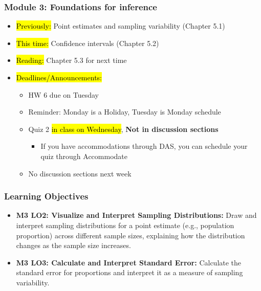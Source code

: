 \begin{frame}
    \frametitle{Module 3: Foundations for inference}
    \begin{itemize}
        \item \hl{Previously: }Point estimates and sampling variability (Chapter 5.1)
        \item \hl{This time: }Confidence intervals (Chapter 5.2)
        \item \hl{Reading: }Chapter 5.3 for next time
        \item \hl{Deadlines/Announcements: }
        \begin{itemize}
            \item HW 6 due on Tuesday
            \item Reminder: Monday is a Holiday, Tuesday is Monday schedule
            \item Quiz 2 \hl{in class on Wednesday}, \textbf{Not in discussion sections}
            \begin{itemize}
                \item If you have accommodations through DAS, you can schedule your quiz through Accommodate
            \end{itemize}
            \item No discussion sections next week
        \end{itemize}
    \end{itemize}
    
\end{frame}
    
\begin{frame}
\frametitle{Learning Objectives}
\begin{itemize}
    \item \textbf{M3 LO2: Visualize and Interpret Sampling Distributions:} Draw and interpret sampling distributions for a point estimate (e.g., population proportion) across different sample sizes, explaining how the distribution changes as the sample size increases. 
    \item \textbf{M3 LO3: Calculate and Interpret Standard Error:} Calculate the standard error for proportions and interpret it as a measure of sampling variability. 
\end{itemize}
\end{frame}
